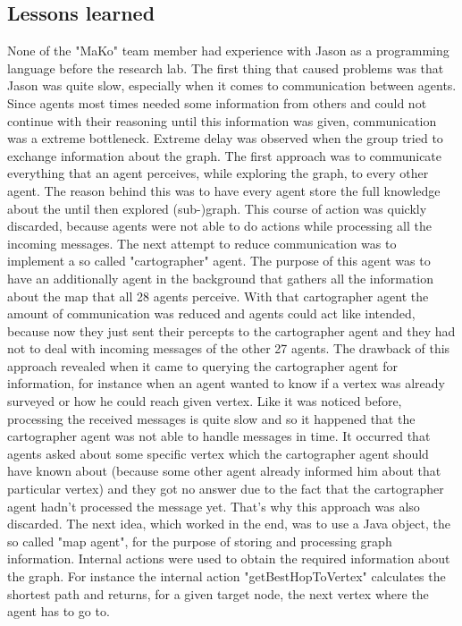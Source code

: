 \subsection{Lessons learned}
None of the "MaKo" team member had experience with Jason as a programming language before the research lab. The first thing that caused problems was that Jason was quite slow, especially when it comes to communication between agents. Since agents most times needed some information from others and could not continue with their reasoning until this information was given, communication was a extreme bottleneck. Extreme delay was observed when the group tried to exchange information about the graph. The first approach was to communicate everything that an agent perceives, while exploring the graph, to every other agent. The reason behind this was to have every agent store the full knowledge about the until then explored (sub-)graph. This course of action was quickly discarded, because agents were not able to do actions while processing all the incoming messages. The next attempt to reduce communication was to implement a so called "cartographer" agent. The purpose of this agent was to have an additionally agent in the background that gathers all the information about the map that all 28 agents perceive. With that cartographer agent the amount of communication was reduced and agents could act like intended, because now they just sent their percepts to the cartographer agent and they had not to deal with incoming messages of the other 27 agents. The drawback of this approach revealed when it came to querying the cartographer agent for information, for instance when an agent wanted to know if a vertex was already surveyed or how he could reach given vertex. Like it was noticed before, processing the received messages is quite slow and so it happened that the cartographer agent was not able to handle messages in time. It occurred that agents asked about some specific vertex which the cartographer agent should have known about (because some other agent already informed him about that particular vertex) and they got no answer due to the fact that the cartographer agent hadn't processed the message yet. That's why this approach was also discarded. The next idea, which worked in the end, was to use a Java object, the so called "map agent", for the purpose of storing and processing graph information. Internal actions were used to obtain the required information about the graph. For instance the internal action "getBestHopToVertex" calculates the shortest path and returns, for a given target node, the next vertex where the agent has to go to.

